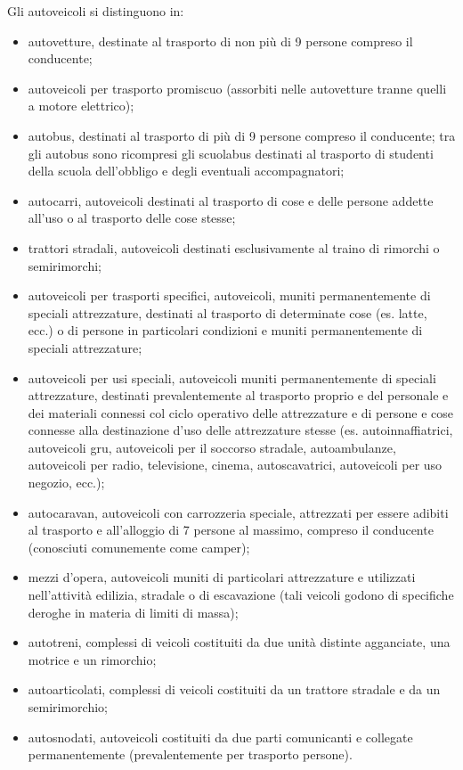	      Gli autoveicoli si distinguono in:
	      \begin{itemize}
	      	\item autovetture, destinate al trasporto di non più di 9 persone compreso il conducente;
	      	\item autoveicoli per trasporto promiscuo (assorbiti nelle autovetture tranne quelli a motore elettrico);
	      	\item autobus, destinati al trasporto di più di 9 persone compreso il conducente; tra gli autobus sono ricompresi gli scuolabus destinati al trasporto di studenti della scuola dell'obbligo e degli eventuali accompagnatori;
	      	\item autocarri, autoveicoli destinati al trasporto di cose e delle persone addette all'uso o al trasporto delle cose stesse;
	      	\item trattori stradali, autoveicoli destinati esclusivamente al traino di rimorchi o semirimorchi;
	      	\item autoveicoli per trasporti specifici, autoveicoli, muniti permanentemente di speciali attrezzature, destinati al trasporto di determinate cose (es. latte, ecc.) o di persone in particolari condizioni e muniti permanentemente di speciali attrezzature;
	      	\item autoveicoli per usi speciali, autoveicoli muniti permanentemente di speciali attrezzature, destinati prevalentemente al trasporto proprio e del personale e dei materiali connessi col ciclo operativo delle attrezzature e di persone e cose connesse alla destinazione d'uso delle attrezzature stesse (es. autoinnaffiatrici, autoveicoli gru, autoveicoli per il soccorso stradale, autoambulanze, autoveicoli per radio, televisione, cinema, autoscavatrici, autoveicoli per uso negozio, ecc.);
	      	\item autocaravan, autoveicoli con carrozzeria speciale, attrezzati per essere adibiti al trasporto e all'alloggio di 7 persone al massimo, compreso il conducente (conosciuti comunemente come camper);
	      	\item mezzi d'opera, autoveicoli muniti di particolari attrezzature e utilizzati nell'attività edilizia, stradale o di escavazione (tali veicoli godono di specifiche deroghe in materia di limiti di massa);
	      	\item autotreni, complessi di veicoli costituiti da due unità distinte agganciate, una motrice e un rimorchio;
	      	\item autoarticolati, complessi di veicoli costituiti da un trattore stradale e da un semirimorchio;
	      	\item autosnodati, autoveicoli costituiti da due parti comunicanti e collegate permanentemente (prevalentemente per trasporto persone). 
	      \end{itemize}
	      

